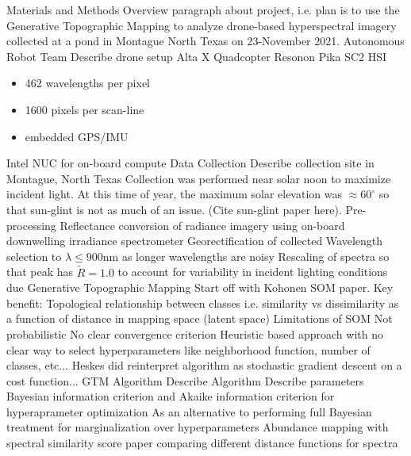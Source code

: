 \documentclass{article}
\begin{document}
\begin{outline}[enumerate]
\1 Materials and Methods
    \2 Overview paragraph about project, i.e. plan is to use the Generative Topographic Mapping to analyze drone-based hyperspectral imagery collected at a pond in Montague North Texas on 23-November 2021. 
   \2 Autonomous Robot Team
        \3 Describe drone setup
            \4 Alta X Quadcopter
            \4 Resonon Pika SC2 HSI
                \begin{itemize}
                    \item 462 wavelengths per pixel
                    \item 1600 pixels per scan-line
                    \item embedded GPS/IMU
               \end{itemize}
             \4 Intel NUC for on-board compute
   \2 Data Collection
        \3 Describe collection site in Montague, North Texas
        \3 Collection was performed near solar noon to maximize incident light. At this time of year, the maximum solar elevation was $\approx 60^\circ$ so that sun-glint is not as much of an issue. (Cite sun-glint paper here).
    \2 Pre-processing
        \3 Reflectance conversion of radiance imagery using on-board downwelling irradiance spectrometer
        \3 Georectification of collected
        \3 Wavelength selection to $\lambda \leq 900 \text{nm}$ as longer wavelengths are noisy
        \3 Rescaling of spectra so that peak has $\tilde{R}  = 1.0$  to account for variability in incident lighting conditions due 
    \2 Generative Topographic Mapping
        \3 Start off with Kohonen SOM paper. Key benefit:
            \4 Topological relationship between classes i.e. similarity vs dissimilarity as a function of distance in mapping space (latent space)
        \3 Limitations of SOM
            \4 Not probabilistic
            \4 No clear convergence criterion
            \4 Heuristic based approach with no clear way to select hyperparameters like neighborhood function, number of classes, etc...
            \4 Heskes did reinterpret algorithm as stochastic gradient descent on a cost function...
        \3 GTM Algorithm
            \4 Describe Algorithm
            \4 Describe parameters
        \3 Bayesian information criterion and Akaike information criterion for hyperaprameter optimization
            \4 As an alternative to performing full Bayesian treatment for marginalization over hyperparameters
        \3 Abundance mapping with spectral similarity score
            \4 paper comparing different distance functions for spectra
                \begin{itemize}

\end{itemize}
\end{outline}
\end{document}
